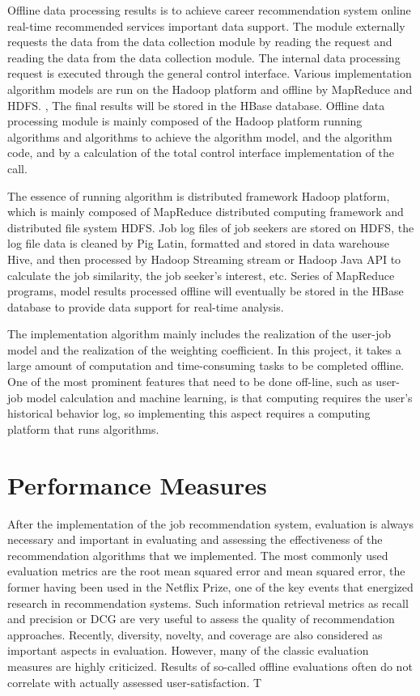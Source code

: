 \documentclass[sigconf]{acmart}
\begin{document}
\par Offline data processing results is to achieve career recommendation system online real-time recommended services important data support. The module externally requests the data from the data collection module by reading the request and reading the data from the data collection module. The internal data processing request is executed through the general control interface. Various implementation algorithm models are run on the Hadoop platform and offline by MapReduce and HDFS. , The final results will be stored in the HBase database. Offline data processing module is mainly composed of the Hadoop platform running algorithms and algorithms to achieve the algorithm model, and the algorithm code, and by a calculation of the total control interface implementation of the call.

\par The essence of running algorithm is distributed framework Hadoop platform, which is mainly composed of MapReduce distributed computing framework and distributed file system HDFS. Job log files of job seekers are stored on HDFS, the log file data is cleaned by Pig Latin, formatted and stored in data warehouse Hive, and then processed by Hadoop Streaming stream or Hadoop Java API to calculate the job similarity, the job seeker's interest, etc. Series of MapReduce programs, model results processed offline will eventually be stored in the HBase database to provide data support for real-time analysis.

\par The implementation algorithm mainly includes the realization of the user-job model and the realization of the weighting coefficient. In this project, it takes a large amount of computation and time-consuming tasks to be completed offline. One of the most prominent features that need to be done off-line, such as user-job model calculation and machine learning, is that computing requires the user's historical behavior log, so implementing this aspect requires a computing platform that runs algorithms.




\section{Performance Measures}
After the implementation of the job recommendation system, evaluation is always necessary and important in evaluating and assessing the effectiveness of the recommendation algorithms that we implemented. The most commonly used evaluation metrics are the root mean squared error and mean squared error, the former having been used in the Netflix Prize, one of the key events that energized research in recommendation systems. Such information retrieval metrics as recall and precision or DCG are very useful to assess the quality of recommendation approaches. Recently, diversity, novelty, and coverage are also considered as important aspects in evaluation. However, many of the classic evaluation measures are highly criticized. Results of so-called offline evaluations often do not correlate with actually assessed user-satisfaction. T
\end{document}
